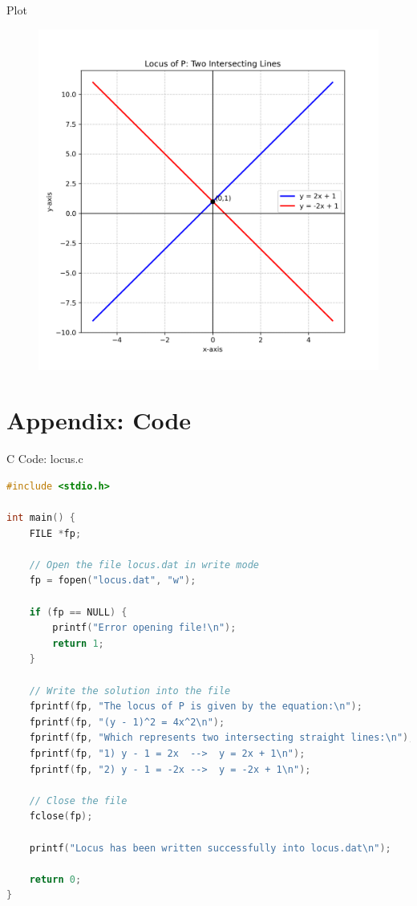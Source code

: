 \documentclass{beamer}
\numberwithin{equation}{section}
\theoremstyle{remark}
\begin{document}
\begin{frame}{Plot}
    \begin{figure}[H]
    \centering
    \includegraphics[width=0.70\columnwidth]{figs/01.png}
    \label{fig-1}
\end{figure}
\end{frame}

\section*{Appendix: Code}

\begin{frame}[fragile]{C Code: locus.c}
\begin{lstlisting}[language=C]
#include <stdio.h>

int main() {
    FILE *fp;

    // Open the file locus.dat in write mode
    fp = fopen("locus.dat", "w");

    if (fp == NULL) {
        printf("Error opening file!\n");
        return 1;
    }

    // Write the solution into the file
    fprintf(fp, "The locus of P is given by the equation:\n");
    fprintf(fp, "(y - 1)^2 = 4x^2\n");
    fprintf(fp, "Which represents two intersecting straight lines:\n");
    fprintf(fp, "1) y - 1 = 2x  -->  y = 2x + 1\n");
    fprintf(fp, "2) y - 1 = -2x -->  y = -2x + 1\n");

    // Close the file
    fclose(fp);

    printf("Locus has been written successfully into locus.dat\n");

    return 0;
}
\end{lstlisting}
\end{frame}
\end{document}
